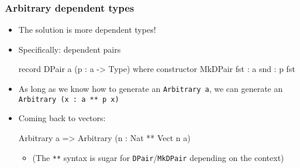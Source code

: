 \documentclass[compress,handout]{beamer}
\begin{document}
\begin{frame}[fragile]
  \frametitle{Arbitrary dependent types}
  
  \begin{itemize}
    \item The solution is more dependent types!
    \item Specifically: dependent pairs

    \vspace*{-6mm}
    \begin{idrislisting}
record DPair a (p : a -> Type) where
  constructor MkDPair
  fst : a
  snd : p fst
    \end{idrislisting}
    \vspace*{-3mm}

    \item As long as we know how to generate an {\textasciigrave
          \texttt{Arbitrary a}\textasciigrave}, we can generate an
          {\textasciigrave\texttt{Arbitrary (x : a ** p x)}\textasciigrave}
    \item Coming back to vectors:
    \vspace*{-6mm}
    \begin{idrislisting}
Arbitrary a => Arbitrary (n : Nat ** Vect n a)
    \end{idrislisting}
    \begin{itemize}
    \vspace*{-2mm}

      \item (The \texttt{**} syntax is sugar for \texttt{DPair}/\texttt{MkDPair}
            depending on the context)
    \end{itemize}
  \end{itemize}

\end{frame}
\end{document}
